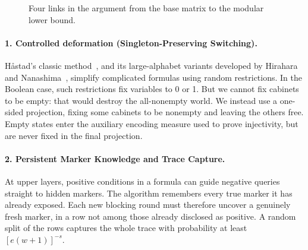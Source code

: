 \documentclass[11pt,a4paper]{article}
\begin{document}
\begin{figure}[htbp]\centering
{}
\caption{Four links in the argument from the base matrix to the modular lower bound.}
\end{figure}

\paragraph{1. Controlled deformation (Singleton-Preserving Switching).}
H\aa stad's classic method~\cite{hastad}, and its large-alphabet variants developed by Hirahara and Nanashima~\cite{hirahara}, simplify complicated formulas using random restrictions. In the Boolean case, such restrictions fix variables to 0 or 1. But we cannot fix cabinets to be empty: that would destroy the all-nonempty world. We instead use a one-sided projection, fixing some cabinets to be nonempty and leaving the others free. Empty states enter the auxiliary encoding measure used to prove injectivity, but are never fixed in the final projection.

\paragraph{2. Persistent Marker Knowledge and Trace Capture.}
At upper layers, positive conditions in a formula can guide negative queries straight to hidden markers. The algorithm remembers every true marker it has already exposed. Each new blocking round must therefore uncover a genuinely fresh marker, in a row not among those already disclosed as positive. A random split of the rows captures the whole trace with probability at least \([e(w+1)]^{-s}\).
\end{document}
